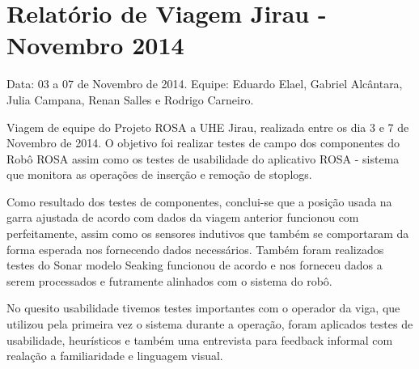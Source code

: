 \section{Relatório de Viagem Jirau - Novembro 2014}
Data: 03 a 07 de Novembro de 2014.
Equipe: Eduardo Elael, Gabriel Alcântara, Julia Campana, Renan Salles e Rodrigo Carneiro.


Viagem de equipe do Projeto ROSA a UHE Jirau, realizada entre
os dia 3 e 7 de Novembro de 2014. O objetivo foi realizar testes de campo dos
componentes do Robô ROSA assim como os testes de usabilidade do aplicativo ROSA
- sistema que monitora as operações de inserção e remoção de stoplogs.

Como resultado dos testes de componentes, conclui-se que a posição usada na
garra ajustada de acordo com dados da viagem anterior funcionou com
perfeitamente, assim como  os sensores indutivos que também se comportaram da
forma esperada nos fornecendo dados necessários.  Também foram realizados
testes do Sonar modelo Seaking funcionou de acordo e nos forneceu dados a serem
processados e futramente alinhados com o sistema do robô.

No quesito usabilidade tivemos testes importantes com o operador da viga, que
utilizou pela primeira vez o sistema durante a operação, foram aplicados
testes de usabilidade, heurísticos e também uma entrevista para feedback
informal com realação a familiaridade e linguagem visual.



